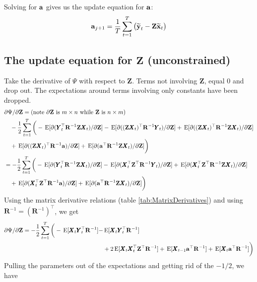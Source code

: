 \documentclass[]{article}
\def\ZZ{\mbox{$\mathbf Z$}}	\def\zz{\mbox{$\mathbf z$}}
\def\RR{\mbox{$\mathbf R$}}	 \def\rr{\mbox{$\mathbf r$}}
\def\XX{\mbox{$\pmb{X}$}}	\def\xx{\mbox{$\pmb{x}$}}
\def\YY{\mbox{$\pmb{Y}$}}	\def\yy{\mbox{$\pmb{y}$}}
\def\E{\,\textup{\textrm{E}}}
\def\hatxt{\widetilde{\mbox{$\mathbf x$}}_t}
\def\hatyt{\widetilde{\mbox{$\mathbf y$}}_t}
\begin{document}
Solving for $\aa$ gives us the update equation for $\aa$: 
\begin{equation}\label{eq:a.update.unconstrained}
\aa_{j+1} = \frac{1}{T}\sum_{t=1}^{T}\big(\hatyt - \ZZ\hatxt \big)
\end{equation}

\subsection{The update equation for $\ZZ$ (unconstrained)}
Take the derivative of $\Psi$  with respect to $\ZZ$.  Terms not involving $\ZZ$, equal 0 and drop out. The expectations around terms involving only constants have been dropped. 
\begin{equation}\label{eq:Z.unconstrained1}
\begin{split}
&\partial\Psi/\partial\ZZ = \text{(note $\partial\ZZ$ is $m \times n$ while $\ZZ$ is $n \times m$)}\\
&\quad -\frac{1}{2} \sum_{t=1}^T\bigg(-\E[\partial(\YY_t^\top\RR^{-1}\ZZ\XX_t)/\partial\ZZ] 
 - \E[\partial((\ZZ\XX_t)^\top\RR^{-1}\YY_t)/\partial\ZZ] + \E[\partial((\ZZ\XX_t)^\top\RR^{-1}\ZZ\XX_t)/\partial\ZZ] \\
&\quad +  \E[\partial((\ZZ\XX_t)^\top\RR^{-1}\aa)/\partial\ZZ] 
+ \E[\partial(\aa^\top\RR^{-1}\ZZ\XX_t)/\partial\ZZ]\bigg)\\
&= -\frac{1}{2} \sum_{t=1}^T\bigg(-\E[\partial(\YY_t^\top\RR^{-1}\ZZ\XX_t)/\partial\ZZ] 
 -\E[\partial(\XX_t^\top\ZZ^\top\RR^{-1}\YY_t)/\partial\ZZ] 
+ \E[\partial(\XX_t^\top\ZZ^\top\RR^{-1}\ZZ\XX_t)/\partial\ZZ]  \\
&\quad + \E[\partial(\XX_t^\top\ZZ^\top\RR^{-1}\aa)/\partial\ZZ] 
+ \E[\partial(\aa^\top\RR^{-1}\ZZ\XX_t)/\partial\ZZ]\bigg)\\
\end{split}
\end{equation}
Using the matrix derivative relations (table \ref{tab:MatrixDerivatives}) and using $\RR^{-1} = (\RR^{-1})^\top$, we get 
\begin{equation}\label{eq:Z.unconstrained2}
\begin{split}
\partial\Psi/\partial\ZZ = -\frac{1}{2} \sum_{t=1}^T\bigg(-\E[ \XX_t\YY_t^\top\RR^{-1} ] - &\E[ \XX_t\YY_t^\top\RR^{-1} ]  \\
&+ 2 \E[\XX_t\XX_t^\top\ZZ^\top\RR^{-1}] + \E[ \XX_{t-1}\aa^\top\RR^{-1} ]  + \E[ \XX_t\aa^\top\RR^{-1} ] \bigg) 
\end{split}
\end{equation}
Pulling the parameters out of the expectations and getting rid of the $-1/2$, we have
\end{document}
